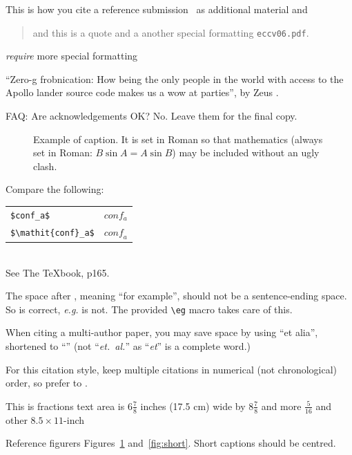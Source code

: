 \documentclass[10pt,twocolumn,letterpaper]{article}
\begin{document}
This is how you cite a reference submission~\cite{Authors06} as additional material and

\begin{quote}
and this is a quote and a another special formatting {\tt eccv06.pdf}.
\end{quote}

{\em require} more special formatting

``Zero-g frobnication: How being the only people in the world with access to
the Apollo lander source code makes us a wow at parties'', by Zeus \etal.

FAQ: Are acknowledgements OK?  No.  Leave them for the final copy.


\begin{figure}[t]
  \begin{center}
    \fbox{\rule{0pt}{2in} \rule{0.9\linewidth}{0pt}}
  \end{center}
    \caption{Example of caption.  It is set in Roman so that mathematics
    (always set in Roman: $B \sin A = A \sin B$) may be included without an
    ugly clash.}
  \label{fig:long}
  \label{fig:onecol}
\end{figure}

\noindent
Compare the following:\\
\begin{tabular}{ll}
 \verb'$conf_a$' &  $conf_a$ \\
 \verb'$\mathit{conf}_a$' & $\mathit{conf}_a$
\end{tabular}\\
See The \TeX book, p165.

The space after \eg, meaning ``for example'', should not be a
sentence-ending space. So \eg is correct, {\em e.g.} is not.  The provided
\verb'\eg' macro takes care of this.

When citing a multi-author paper, you may save space by using ``et alia'',
shortened to ``\etal'' (not ``{\em et.\ al.}'' as ``{\em et}'' is a complete word.)

For this citation style, keep multiple citations in numerical (not
chronological) order, so prefer \cite{Alpher03,Alpher02,Authors06} to
\cite{Alpher02,Alpher03,Authors06}.





This is fractions text area is $6\frac78$ inches (17.5 cm) wide by $8\frac78$
and more $\frac{5}{16}$ and other $8.5 \times 11$-inch

Reference figurers Figures~\ref{fig:onecol} and~\ref{fig:short}.  Short captions should be centred.
\end{document}
